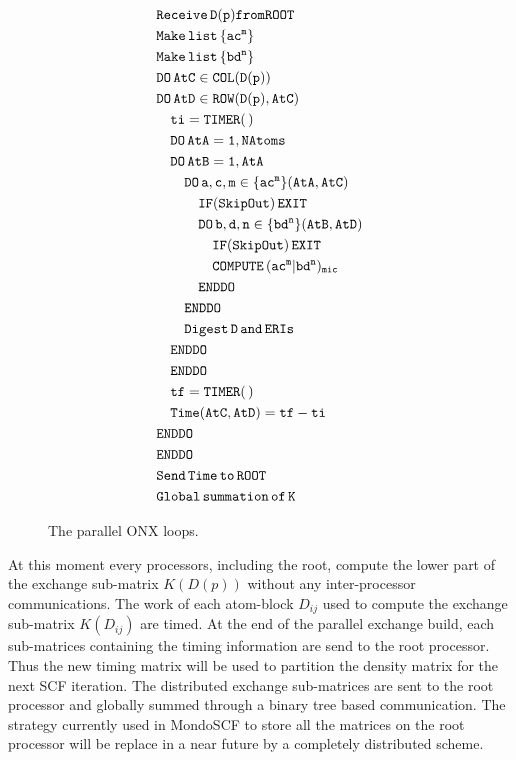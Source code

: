 \documentclass[prl,twocolumn,showpacs,twocolumngrid,superbib]{revtex4}
\begin{document}
\begin{figure}[htbp]
  \centering
  \caption{\protect
    The parallel ONX loops. 
  }\label{Fig:ONXcore}
  \begin{equation*}
    \begin{split}
      &\tt        Receive\,D(p) from ROOT\\
      &\tt        Make\,list\,\{ac^m\} \\
      &\tt        Make\,list\,\{bd^n\} \\
      &\tt        DO\,AtC\in COL(D(p)) \\
      &\tt        DO\,AtD\in ROW(D(p),AtC) \\
      &\tt\quad     ti=TIMER(\,) \\
      &\tt\quad     DO\,AtA=1,NAtoms \\
      &\tt\quad     DO\,AtB=1,AtA \\
      &\tt\qquad      DO\,a,c,m\in\{ac^m\}(AtA,AtC) \\
      &\tt\qquad\quad   IF(SkipOut)\,EXIT  \\
      &\tt\qquad\quad   DO\,b,d,n\in\{bd^n\}(AtB,AtD) \\
      &\tt\qquad\qquad    IF(SkipOut)\,EXIT  \\
      &\tt\qquad\qquad    COMPUTE\,(ac^m|bd^n)_{mic} \\
      &\tt\qquad\quad   ENDDO \\
      &\tt\qquad      ENDDO \\
      &\tt\qquad      Digest\,D\,and\,ERIs \\
      &\tt\quad     ENDDO \\
      &\tt\quad     ENDDO \\
      &\tt\quad     tf=TIMER(\,) \\
      &\tt\quad     Time(AtC,AtD)=tf-ti \\
      &\tt        ENDDO \\
      &\tt        ENDDO \\
      &\tt        Send\,Time\,to\,ROOT \\
      &\tt        Global\,summation\,of\,K 
    \end{split}
  \end{equation*}
\end{figure}

 At this moment every processors, including the root, compute 
 the lower part of the exchange sub-matrix $K(D(p))$ 
 without any inter-processor communications. 
 The work of each atom-block
 $D_{ij}$ used to compute the exchange 
 sub-matrix $K(D_{ij})$ are timed.
 At the end of the parallel exchange build, each sub-matrices containing 
 the timing information are send to the root processor.
 Thus the new timing matrix will be used to partition the density 
 matrix for the next SCF iteration.
 The distributed exchange sub-matrices are sent to the root processor and globally 
 summed through a binary tree based communication.
 The strategy currently used in MondoSCF to store all the matrices on 
 the root processor will be replace in a near future
 by a completely distributed scheme.
 
\end{document}
